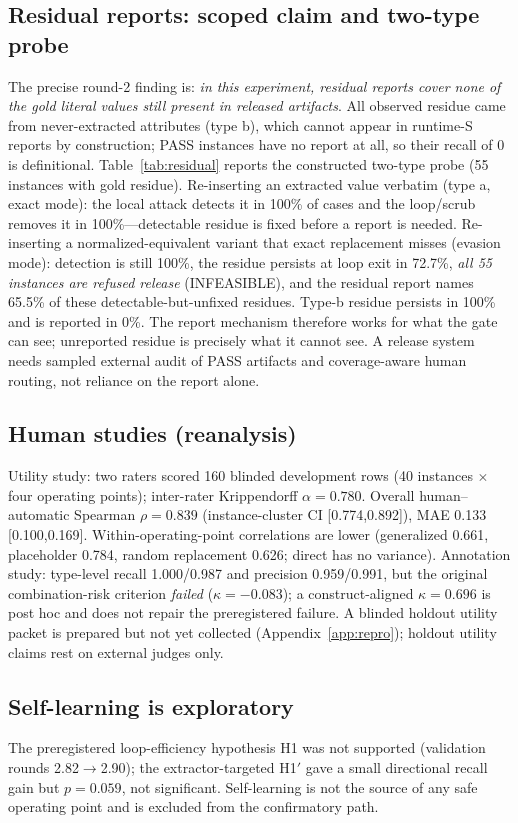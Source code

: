 \documentclass[journal]{IEEEtran}
\begin{document}
\subsection{Residual reports: scoped claim and two-type probe}\label{sec:res-residual}
The precise round-2 finding is: \emph{in this experiment, residual reports cover none of the gold literal values still present in released artifacts}. All observed residue came from never-extracted attributes (type b), which cannot appear in runtime-S reports by construction; PASS instances have no report at all, so their recall of 0 is definitional. Table~\ref{tab:residual} reports the constructed two-type probe (55 instances with gold residue). Re-inserting an extracted value verbatim (type a, exact mode): the local attack detects it in 100\% of cases and the loop/scrub removes it in 100\%---detectable residue is fixed before a report is needed. Re-inserting a normalized-equivalent variant that exact replacement misses (evasion mode): detection is still 100\%, the residue persists at loop exit in 72.7\%, \emph{all 55 instances are refused release} (INFEASIBLE), and the residual report names 65.5\% of these detectable-but-unfixed residues. Type-b residue persists in 100\% and is reported in 0\%. The report mechanism therefore works for what the gate can see; unreported residue is precisely what it cannot see. A release system needs sampled external audit of PASS artifacts and coverage-aware human routing, not reliance on the report alone.

\subsection{Human studies (reanalysis)}
Utility study: two raters scored 160 blinded development rows (40 instances $\times$ four operating points); inter-rater Krippendorff $\alpha=0.780$. Overall human--automatic Spearman $\rho=0.839$ (instance-cluster CI [0.774,0.892]), MAE 0.133 [0.100,0.169]. Within-operating-point correlations are lower (generalized 0.661, placeholder 0.784, random replacement 0.626; direct has no variance). Annotation study: type-level recall 1.000/0.987 and precision 0.959/0.991, but the original combination-risk criterion \emph{failed} ($\kappa=-0.083$); a construct-aligned $\kappa=0.696$ is post hoc and does not repair the preregistered failure. A blinded holdout utility packet is prepared but not yet collected (Appendix~\ref{app:repro}); holdout utility claims rest on external judges only.

\subsection{Self-learning is exploratory}
The preregistered loop-efficiency hypothesis H1 was not supported (validation rounds 2.82$\to$2.90); the extractor-targeted H1$'$ gave a small directional recall gain but $p=0.059$, not significant. Self-learning is not the source of any safe operating point and is excluded from the confirmatory path.
\end{document}

